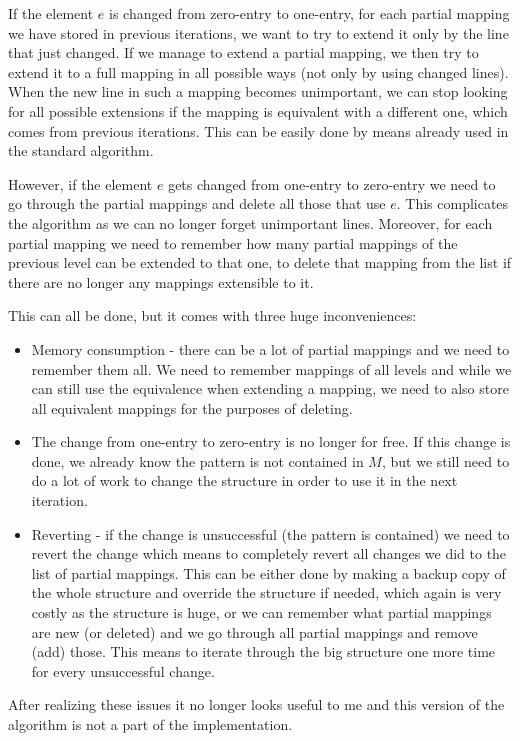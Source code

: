 If the element $e$ is changed from zero-entry to one-entry, for each partial mapping we have stored in previous iterations, we want to try to extend it only by the line that just changed. If we manage to extend a partial mapping, we then try to extend it to a full mapping in all possible ways (not only by using changed lines). When the new line in such a mapping becomes unimportant, we can stop looking for all possible extensions if the mapping is equivalent with a different one, which comes from previous iterations. This can be easily done by means already used in the standard algorithm.

However, if the element $e$ gets changed from one-entry to zero-entry we need to go through the partial mappings and delete all those that use $e$. This complicates the algorithm as we can no longer forget unimportant lines. Moreover, for each partial mapping we need to remember how many partial mappings of the previous level can be extended to that one, to delete that mapping from the list if there are no longer any mappings extensible to it.

This can all be done, but it comes with three huge inconveniences:
\begin{itemize}
\item Memory consumption - there can be a lot of partial mappings and we need to remember them all. We need to remember mappings of all levels and while we can still use the equivalence when extending a mapping, we need to also store all equivalent mappings for the purposes of deleting.
\item The change from one-entry to zero-entry is no longer for free. If this change is done, we already know the pattern is not contained in $M$, but we still need to do a lot of work to change the structure in order to use it in the next iteration.
\item Reverting - if the change is unsuccessful (the pattern is contained) we need to revert the change which means to completely revert all changes we did to the list of partial mappings. This can be either done by making a backup copy of the whole structure and override the structure if needed, which again is very costly as the structure is huge, or we can remember what partial mappings are new (or deleted) and we go through all partial mappings and remove (add) those. This means to iterate through the big structure one more time for every unsuccessful change.
\end{itemize}
After realizing these issues it no longer looks useful to me and this version of the algorithm is not a part of the implementation.


